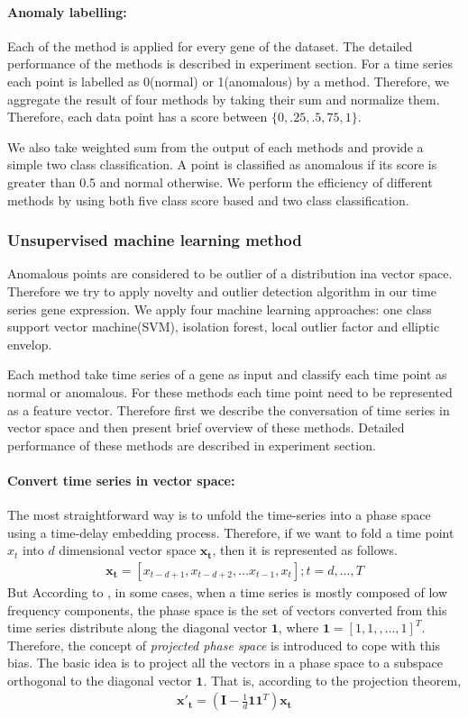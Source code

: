 \paragraph*{\textbf{Anomaly labelling:}} Each of the method is applied for every gene of the dataset. The detailed performance of the methods is described in experiment section. For a time series each point is labelled as 0(normal) or 1(anomalous) by a method. Therefore, we aggregate the result of four methods by taking their sum and normalize them. Therefore, each data point has a score between $\{0,.25,.5,75,1\}$. 

We also take weighted sum from the output of each methods and provide a simple two class classification. A point is classified as anomalous if its score is greater than 0.5 and normal otherwise. We perform the efficiency of different methods by using both five class score based and two class classification.


\subsubsection{Unsupervised machine learning method}
Anomalous points are considered to be outlier of a distribution ina vector space. Therefore we try to apply novelty  and outlier detection algorithm in our time series gene expression.
We apply four machine learning approaches: one class support vector machine(SVM), isolation forest, local outlier factor and elliptic envelop. 

Each  method  take time series of a gene as input and classify each time point as normal or anomalous. For these methods each time point need to be represented as a feature vector. Therefore first we describe the conversation of time series in vector space and then present brief overview of these methods. Detailed performance of these methods are described in experiment section.

\paragraph{\textbf{Convert time series in vector space:}}   The
most straightforward way is to unfold the time-series into a
phase space using a time-delay embedding process. Therefore, if we want to fold a time point $x_t$ into $d$ dimensional vector space $\bm{x_t}$, then it is represented as follows.
\begin{align*}
    \bm{x_t} = [x_{t-d+1}, x_{t-d+2},\dots x_{t-1},x_t]; t=d,\dots,T
\end{align*}
But According to \cite{svm}, in some cases, when a time series is mostly composed of
low frequency components, the phase space is the set of
vectors converted from this time series distribute along the
diagonal vector $\bm{1}$, where $\bm{1}=[1,1,,\dots,1]^T$. Therefore, the concept of
\textit{projected phase space} is introduced to cope with this bias. The basic idea is to project all the vectors in a phase space
to a subspace orthogonal to the diagonal vector $\bm{1}$. That is,
according to the projection theorem,
\begin{align*}
    \bm{x'_t}=(\bm{I}-\frac{1}{d}\bm{1}\bm{1}^T)\bm{x_t}
\end{align*}

